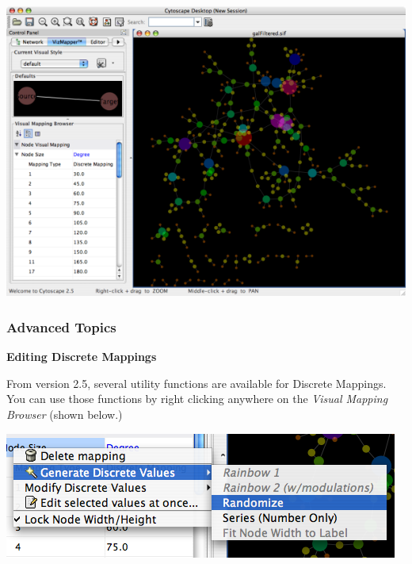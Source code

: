 \begin{enumerate}
 \includegraphics[width=.6\textwidth]{images/tutorial4_last.png} 


\end{enumerate}


 

\subsubsection*{Advanced Topics}


 \textbf{Editing Discrete Mappings}


 From version 2.5, several utility functions are available for Discrete Mappings. You can use those functions by right clicking anywhere on the \emph{Visual Mapping Browser}
 (shown below.) 


 \includegraphics[width=.6\textwidth]{images/VizMapperPopupMenu.png} 


